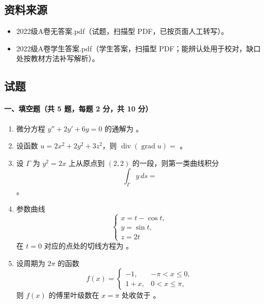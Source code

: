 \subsection{资料来源}
\begin{itemize}
  \item 2022级A卷无答案.pdf（试题，扫描型 PDF，已按页面人工转写）。
  \item 2022级A卷学生答案.pdf（学生答案，扫描型 PDF；能辨认处用于校对，缺口处按教材方法补写解析）。
\end{itemize}

\subsection{试题}

\paragraph*{一、填空题（共 5 题，每题 2 分，共 10 分）}
\begin{enumerate}
  \item 微分方程 $y''+2y'+6y=0$ 的通解为 \underline{\hspace{4cm}}。
  \item 设函数 $u=2x^2+2y^2+3z^2$，则 $\operatorname{div}(\operatorname{grad}u)=$ \underline{\hspace{3cm}}。
  \item 设 $\Gamma$ 为 $y^2=2x$ 上从原点到 $(2,2)$ 的一段，则第一类曲线积分
  \[
    \int_\Gamma y\,ds=
  \]
  \underline{\hspace{3cm}}。
  \item 参数曲线
  \[
    \begin{cases}
      x=t-\cos t,\\
      y=\sin t,\\
      z=2t
    \end{cases}
  \]
  在 $t=0$ 对应的点处的切线方程为 \underline{\hspace{5cm}}。
  \item 设周期为 $2\pi$ 的函数
  \[
    f(x)=
    \begin{cases}
      -1, & -\pi<x\le 0,\\
      1+x, & 0<x\le \pi,
    \end{cases}
  \]
  则 $f(x)$ 的傅里叶级数在 $x=\pi$ 处收敛于 \underline{\hspace{3cm}}。
\end{enumerate}

